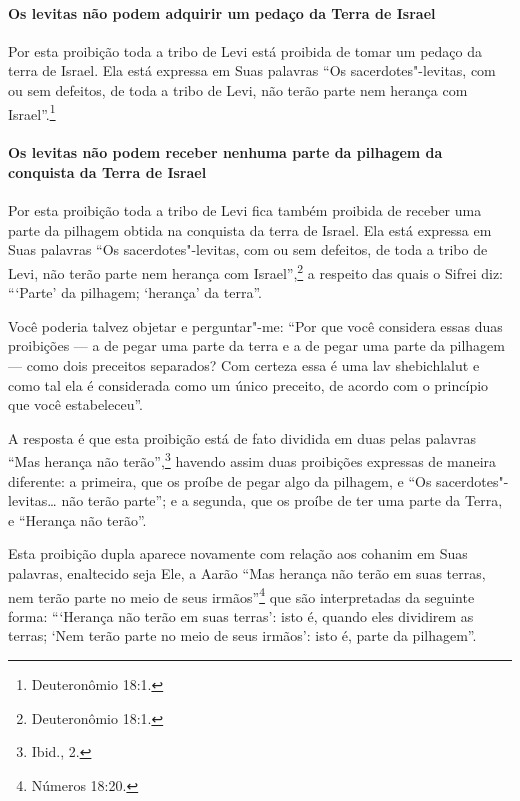\begin{multicols}{2}
\paragraph{Os levitas\starr{} não podem adquirir um pedaço da Terra de Israel}

Por esta proibição toda a tribo de Levi\starr{} está proibida de tomar um pedaço
da terra de Israel. Ela está expressa em Suas palavras ``Os sacerdotes"-levitas\starr, com ou sem defeitos, de toda a tribo de Levi\starr, não terão parte
nem herança com Israel''.\footnote{Deuteronômio 18:1.}

\paragraph{Os levitas\starr{} não podem receber nenhuma parte da pilhagem da conquista
da Terra de Israel}

Por esta proibição toda a tribo de Levi\starr{} fica também proibida de receber
uma parte da pilhagem obtida na conquista da terra de Israel. Ela está
expressa em Suas palavras ``Os sacerdotes"-levitas\starr, com ou sem defeitos,
de toda a tribo de Levi\starr, não terão parte nem herança com Israel'',\footnote{Deuteronômio 18:1.} a respeito das quais o Sifrei\starr{} diz: ```Parte' da
pilhagem; `herança' da terra''.

Você poderia talvez objetar e perguntar"-me: ``Por que você considera
essas duas proibições --- a de pegar uma parte da terra e a de pegar uma
parte da pilhagem --- como dois preceitos separados? Com certeza essa é
uma lav shebichlalut\starr{} e como tal ela é
considerada como um único preceito, de acordo com o princípio que você
estabeleceu''.

A resposta é que esta proibição está de fato dividida em duas pelas
palavras ``Mas herança não terão'',\footnote{Ibid., 2.} havendo assim duas
proibições expressas de maneira diferente: a primeira, que os proíbe de
pegar algo da pilhagem, e ``Os sacerdotes"-levitas\starr\ldots{} não terão parte'';
e a segunda, que os proíbe de ter uma parte da Terra, e ``Herança não
terão''.

Esta proibição dupla aparece novamente com relação aos cohanim\starr{} em
Suas palavras, enaltecido seja Ele, a Aarão ``Mas herança não terão em
suas terras, nem terão parte no meio de seus irmãos''\footnote{Números 18:20.}
que são interpretadas da seguinte forma: ```Herança não terão em suas
terras': isto é, quando eles dividirem as terras; `Nem terão parte no
meio de seus irmãos': isto é, parte da pilhagem''.


\end{multicols}
